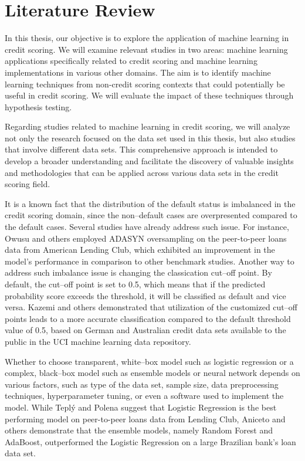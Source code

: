 \chapter{Literature Review}
\label{chap:three}

In this thesis, our objective is to explore the application of machine learning in credit scoring. We will examine relevant studies in two areas: machine learning applications specifically related to credit scoring and machine learning implementations in various other domains. The aim is to identify machine learning techniques from non-credit scoring contexts that could potentially be useful in credit scoring. We will evaluate the impact of these techniques through hypothesis testing.

Regarding studies related to machine learning in credit scoring, we will analyze not only the research focused on the data set used in this thesis, but also studies that involve different data sets. This comprehensive approach is intended to develop a broader understanding and facilitate the discovery of valuable insights and methodologies that can be applied across various data sets in the credit scoring field.

It is a known fact that the distribution of the default status is imbalanced in the credit scoring domain, since the non--default cases are overpresented compared to the default cases. Several studies have already address such issue.
For instance, Owusu and others \citep{owusu2023deep} employed ADASYN oversampling on the peer-to-peer loans data from American Lending Club, which exhibited an improvement in the model's performance in comparison to other benchmark studies.
Another way to address such imbalance issue is changing the classication cut--off point.
By default, the cut--off point is set to 0.5, which means that if the predicted probability score exceeds the threshold, it will be classified as default and vice versa. Kazemi and others \citep{kazemi2023estimation} demonstrated that utilization of the customized cut--off points leads to a more accurate classification compared to the default threshold value of 0.5, based on German and Australian credit data sets available to the public in the UCI machine learning data repository.


Whether to choose transparent, white--box model such as logistic regression or a complex, black--box model such as ensemble models or neural network depends on various factors, such as type of the data set, sample size, data preprocessing techniques, hyperparameter tuning, or even a software used to implement the model.
While Tepl\'{y} and Polena \citep{teply2020best} suggest that Logistic Regression is the best performing model on peer-to-peer loans data from Lending Club, Aniceto and others \citep{aniceto2020machine} demonstrate that the ensemble models, namely Random Forest and AdaBoost, outperformed the Logistic Regression on a large Brazilian bank's loan data set.


